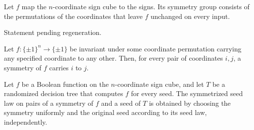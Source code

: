 \begin{definition}
\label{FABL.booleanFunctionSymmetryGroup}
\leanok
{}
Let $f$ map the $n$-coordinate sign cube to the signs. Its symmetry group consists of
the permutations of the coordinates that leave $f$ unchanged on every input.
\end{definition}

\begin{theorem}
\label{FABL.mem_booleanFunctionSymmetryGroup}
\leanok
{}
Statement pending regeneration.
\end{theorem}

\begin{theorem}
\label{FABL.exists_booleanFunctionSymmetry_apply_eq}
\leanok
{}
Let $f:\{\pm1\}^n\to\{\pm1\}$ be invariant under some coordinate permutation carrying
any specified coordinate to any other. Then, for every pair of coordinates $i,j$, a
symmetry of $f$ carries $i$ to $j$.
\end{theorem}

\begin{definition}
\label{FABL.RandomizedDecisionTree.symmetrizedSeedLaw}
\leanok
{}
Let $f$ be a Boolean function on the $n$-coordinate sign cube, and let $T$ be a
randomized decision tree that computes $f$ for every seed. The symmetrized seed law on
pairs of a symmetry of $f$ and a seed of $T$ is obtained by choosing the symmetry
uniformly and the original seed according to its seed law, independently.
\end{definition}

